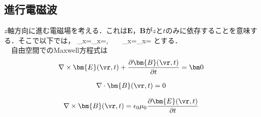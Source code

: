 






















%
\subsection{進行電磁波}
$z$軸方向に進む電磁場を考える．これは${\bm{E}}$，${\bm{B}}$が$z$と$t$のみに依存することを意味する．そこで以下では，
\be
\partial_x{}=\partial_x{}=,\ \ \ \ \partial_x{}=\partial_x{}=
\ee
とする．\\
　自由空間でのMaxwell方程式は
\begin{align}
\label{mx1}
\nabla\times\bm{E}(\vr,t)+\dfrac{\partial\bm{B}(\vr,t)}{\partial t}=\bm 0
\end{align}

\begin{align}
\label{mx2}
\nabla\cdot\bm{B}(\vr,t)=0
\end{align}

\begin{align}
\label{mx3}
   \nabla\times\bm{B}(\vr,t)=\epsilon_0\mu_0\dfrac{\partial\bm{E}(\vr,t)}{\partial t}
\end{align}


